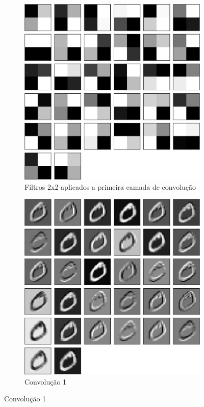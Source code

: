 \documentclass[
	12pt,				%
	oneside,			%
	a4paper,			%
	english,			%
	french,				%
	spanish,			%
	brazil,				%
	]{abntex2}
\begin{document}
\begin{center}
\begin{figure}[h]
\centering

\begin{subfigure}{.8\textwidth}
\centering
\includegraphics[width=.6\linewidth]{images/fabio/resultados/network_3/filter_convolution2d_1}%
\caption{Filtros 2x2 aplicados a primeira camada de convolução}		
\label{fig:filtros2x2}	
\end{subfigure}%

\begin{subfigure}{.8\textwidth}
\centering
\includegraphics[width=.6\linewidth]{images/fabio/resultados/network_3/input_1_layer_convolution2d_1}
\caption{Convolução 1}
\end{subfigure}%


\end{figure}
\end{center}
\end{document}
